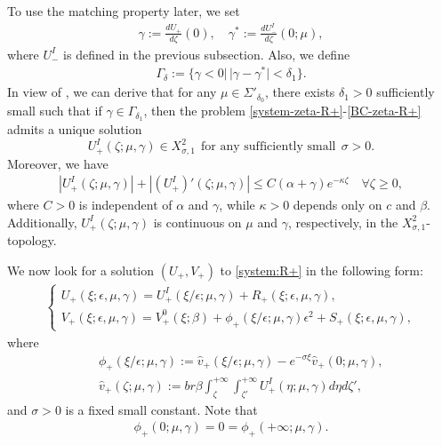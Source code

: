 \documentclass[11pt,a4paper]{article}
\numberwithin{equation}{section}
\numberwithin{figure}{section}
\newcommand\ep{\epsilon}
\newcommand\bea{\begin{eqnarray}}
\newcommand\eea{\end{eqnarray}}
\newcommand\beaa{\begin{eqnarray*}}
\newcommand\eeaa{\end{eqnarray*}}
\begin{document}
To use the matching property later, we set
\bea\label{gamma*}
\gamma:=\frac{d U_+}{d \zeta}(0),\quad \gamma^*:=\frac{d U^{I}_-}{d \zeta} (0;\mu),
\eea
where $U^{I}_-$ is defined in the previous subsection. Also, we define
\beaa
\Gamma_{\delta}:=\{\gamma<0|\, |\gamma-\gamma^*|<\delta_1\}.
\eeaa
In view of \cite[Lemma 4.2]{Hosono 2003}, we can derive that for any $\mu\in\Sigma'_{\delta_0}$,
there exists $\delta_1>0$ sufficiently small such that if $\gamma\in \Gamma_{\delta_1}$, then
the problem \eqref{system-zeta-R+}-\eqref{BC-zeta-R+} admits a unique solution 
$$U_+^{I}(\zeta;\mu,\gamma)\in X^2_{\sigma,1}\ \ \text{for any sufficiently small}\ \ \sigma>0.$$ Moreover,
we have
\beaa
|U_+^{I}(\zeta;\mu,\gamma)|+|(U_+^{I})'(\zeta;\mu,\gamma)|\leq C (\alpha+\gamma)e^{-\kappa \zeta}\quad \forall \zeta\geq0,
\eeaa
where $C>0$ is independent of $\alpha$ and $\gamma$, while $\kappa>0$ depends only on $c$ and $\beta$.
Additionally, $U_+^{I}(\zeta;\mu,\gamma)$ is continuous on $\mu$ and $\gamma$, respectively, in the $X^2_{\sigma,1}$-topology.


We now look for a solution $(U_{+}, V_{+})$ to \eqref{system:R+} in the following form:
\bea\label{exact-sol-R+}
\begin{cases}
 U_{+}(\xi;\epsilon,\mu,\gamma)=U_+^{I}(\xi/\ep;\mu,\gamma)+R_+(\xi;\epsilon,\mu,\gamma),\\
 V_{+}(\xi;\epsilon,\mu,\gamma)=V^0_{+}(\xi;\beta)+\phi_+(\xi/\ep;\mu,\gamma)\epsilon^2+S_+(\xi;\epsilon,\mu,\gamma),
\end{cases}
\eea
where
\beaa
&&\phi_+(\xi/\ep;\mu,\gamma):=\hat{v}_+(\xi/\epsilon;\mu,\gamma)-e^{-\sigma \xi}\hat{v}_+(0;\mu,\gamma),\\
&&\hat{v}_+(\zeta;\mu,\gamma):=br\beta\int_{\zeta}^{+\infty}\int_{\zeta'}^{+\infty}U_{+}^{I}(\eta;\mu,\gamma)d\eta d\zeta',
\eeaa
and $\sigma>0$ is a fixed small constant. Note that
\beaa
\phi_+(0;\mu,\gamma)=0=\phi_+(+\infty;\mu,\gamma).
\eeaa
\end{document}

